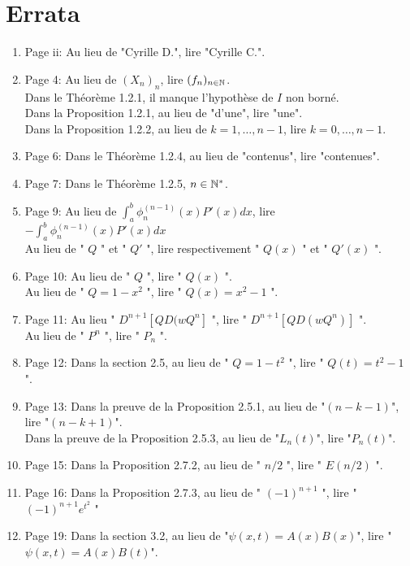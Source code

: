 \documentclass[a4paper,11pt]{book}
\begin{document}
\chapter*{Errata}

\begin{enumerate}
\item Page ii: Au lieu de "Cyrille D.", lire "Cyrille C.".
\item Page 4:  Au lieu de $(X_n)_n$, lire $ (f_n)_{n\in \mathbb N}$.
\\             Dans le Théorème 1.2.1, il manque l'hypothèse de $I$ non borné.
\\             Dans la Proposition 1.2.1, au lieu de "d'une", lire "une".
\\             Dans la Proposition 1.2.2, au lieu de $ k=1,\dots,n-1 $, lire $ k=0,\dots,n-1 $.
\item Page 6:  Dans le Théorème 1.2.4, au lieu de "contenus", lire "contenues".
\item Page 7:  Dans le Théorème 1.2.5, $n\in \mathbb N^*$.
\item Page 9:  Au lieu de $\displaystyle{\int_a^b{\phi_n^{(n-1)}}(x)P'(x)dx}$, lire $\displaystyle{- \int_a^b{\phi_n^{(n-1)}}(x)P'(x)dx}$
\\             Au lieu de " $Q$ " et " $Q'$ ", lire respectivement " $Q(x)$ " et " $Q'(x)$ ".
\item Page 10: Au lieu de " $Q$ ", lire " $Q(x)$ ".
\\             Au lieu de " $Q=1-x^2$ ", lire " $Q(x)=x^2-1$ ".
\item Page 11: Au lieu " $D^{n+1}[QD(wQ^n]$ ", lire " $D^{n+1}[QD(wQ^n)]$ ".
\\             Au lieu de " $P^n$ ", lire " $P_n$ ".
\item Page 12: Dans la section 2.5, au lieu de " $Q=1-t^2$ ", lire " $Q(t)=t^2-1$ ".
\item Page 13: Dans la preuve de la Proposition 2.5.1, au lieu de "$(n-k-1)$", lire "$(n-k+1)$".
\\             Dans la preuve de la Proposition 2.5.3, au lieu de "$L_n(t)$", lire "$P_n(t)$".
\item Page 15: Dans la Proposition 2.7.2, au lieu de " $n/2$ ", lire " $E(n/2)$ ".
\item Page 16: Dans la Proposition 2.7.3, au lieu de " $(-1)^{n+1}$ ", lire " $(-1)^{n+1}e^{t^2}$ "
\item Page 19: Dans la section 3.2, au lieu de "$\psi(x,t)=A(x)B(x)$", lire "$\psi(x,t)=A(x)B(t)$".
\end{enumerate}
\end{document}
